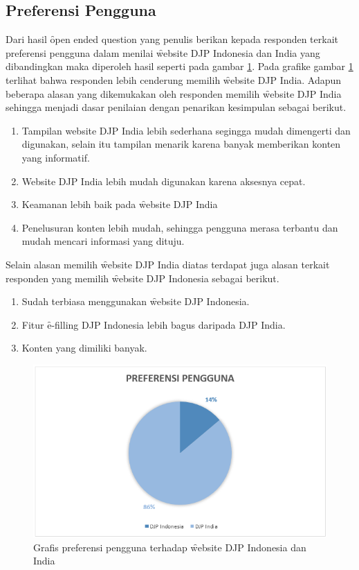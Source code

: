 \subsection{Preferensi Pengguna}
Dari hasil \f{open ended question} yang penulis berikan kepada responden terkait preferensi pengguna dalam menilai \f{website} DJP Indonesia dan India yang dibandingkan maka diperoleh hasil seperti pada gambar \ref{fig:preferensigraf}. Pada grafike gambar \ref{fig:preferensigraf} terlihat bahwa responden lebih cenderung memilih \f{website} DJP India.
Adapun beberapa alasan yang dikemukakan oleh responden memilih \f{website} DJP India sehingga menjadi dasar penilaian dengan penarikan kesimpulan sebagai berikut.
\begin{enumerate}
	\item Tampilan website DJP India lebih sederhana segingga mudah dimengerti dan digunakan, selain itu tampilan menarik karena banyak memberikan konten yang informatif.
	\item {Website} DJP India lebih mudah digunakan karena aksesnya cepat.
	\item Keamanan lebih baik pada \f{website} DJP India
	\item Penelusuran konten lebih mudah, sehingga pengguna merasa terbantu dan mudah mencari informasi yang dituju.
\end{enumerate}
Selain alasan memilih \f{website} DJP India diatas terdapat juga alasan terkait responden yang memilih \f{website} DJP Indonesia sebagai berikut.
\begin{enumerate}
	\item Sudah terbiasa menggunakan \f{website} DJP Indonesia.
	\item Fitur \f{e-filling} DJP Indonesia lebih bagus daripada DJP India.
	\item Konten yang dimiliki banyak.
\end{enumerate}

\begin{figure}
	\centering
	\includegraphics[width=\textwidth]
	{pics/preferensipengguna.PNG}
	\caption{Grafis preferensi pengguna terhadap \f{website} DJP Indonesia dan India}
	\label{fig:preferensigraf}
\end{figure}
\pagebreak
